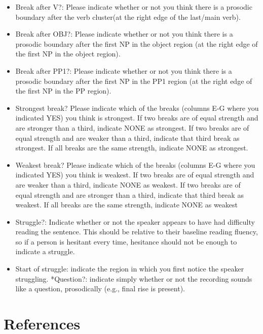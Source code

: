 \documentclass[12pt,oneside]{book}
\providecommand{\tightlist}{%
  \setlength{\itemsep}{0pt}\setlength{\parskip}{0pt}}
\begin{document}
\begin{itemize}
\tightlist
\item
  Break after V?: Please indicate whether or not you think there is a prosodic boundary after the verb cluster(at the right edge of the last/main verb).
\item
  Break after OBJ?: Please indicate whether or not you think there is a prosodic boundary after the first NP in the object region (at the right edge of the first NP in the object region).
\item
  Break after PP1?: Please indicate whether or not you think there is a prosodic boundary after the first NP in the PP1 region (at the right edge of the first NP in the PP region).
\item
  Strongest break? Please indicate which of the breaks (columns E-G where you indicated YES) you think is strongest. If two breaks are of equal strength and are stronger than a third, indicate NONE as strongest. If two breaks are of equal strength and are weaker than a third, indicate that third break as strongest. If all breaks are the same strength, indicate NONE as strongest.
\item
  Weakest break? Please indicate which of the breaks (columns E-G where you indicated YES) you think is weakest. If two breaks are of equal strength and are weaker than a third, indicate NONE as weakest. If two breaks are of equal strength and are stronger than a third, indicate that third break as weakest. If all breaks are the same strength, indicate NONE as weakest
\item
  Struggle?: Indicate whether or not the speaker appears to have had difficulty reading the sentence. This should be relative to their baseline reading fluency, so if a person is hesitant every time, hesitance should not be enough to indicate a struggle.
\item
  Start of struggle: indicate the region in which you first notice the speaker struggling.
  *Question?: indicate simply whether or not the recording sounds like a question, prosodically (e.g., final rise is present).
\end{itemize}

\clearpage

\hypertarget{references}{%
\chapter*{References}\label{references}}

\noindent
\vspace{-2em}
\setlength{\parindent}{-0.5in}
\setlength{\leftskip}{0.5in}
\setlength{\parskip}{15pt}
\onehalfspacing
\end{document}
